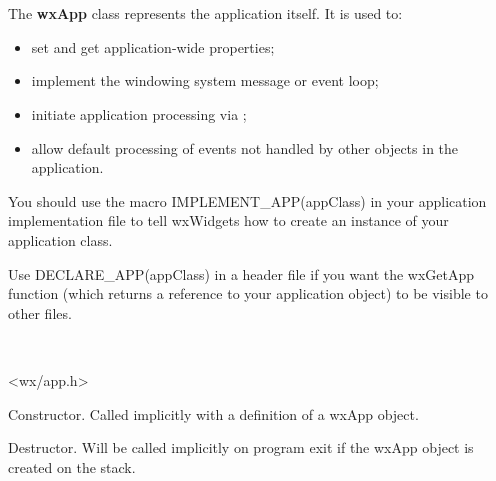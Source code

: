 \section{}\label{wxapp}

The {\bf wxApp} class represents the application itself. It is used
to:

\begin{itemize}\itemsep=0pt
\item set and get application-wide properties;
\item implement the windowing system message or event loop;
\item initiate application processing via ;
\item allow default processing of events not handled by other
objects in the application.
\end{itemize}

You should use the macro IMPLEMENT\_APP(appClass) in your application implementation
file to tell wxWidgets how to create an instance of your application class.

Use DECLARE\_APP(appClass) in a header file if you want the wxGetApp function (which returns
a reference to your application object) to be visible to other files.


\\


<wx/app.h>







\label{wxappctor}


Constructor. Called implicitly with a definition of a wxApp object.


\label{wxappdtor}


Destructor. Will be called implicitly on program exit if the wxApp
object is created on the stack.


